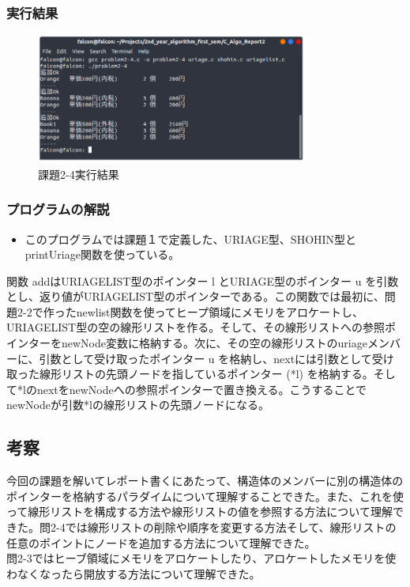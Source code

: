 \documentclass[10pt]{article}
\begin{document}
\subsubsection{実行結果}
\begin{figure}[H]
	\centering
	\includegraphics[width=0.8\textwidth]{problem2-4.png}
	\caption{課題2-4実行結果}
\end{figure}

\subsubsection{プログラムの解説}
\begin{itemize}
    \item このプログラムでは課題１で定義した、URIAGE型、SHOHIN型とprintUriage関数を使っている。
\end{itemize}

関数 addはURIAGELIST型のポインター l とURIAGE型のポインター u を引数とし、返り値がURIAGELIST型のポインターである。この関数では最初に、問題2-2で作ったnewlist関数を使ってヒープ領域にメモリをアロケートし、URIAGELIST型の空の線形リストを作る。そして、その線形リストへの参照ポインターをnewNode変数に格納する。次に、その空の線形リストのuriageメンバーに、引数として受け取ったポインター u を格納し、nextには引数として受け取った線形リストの先頭ノードを指しているポインター (*l) を格納する。そして*lのnextをnewNodeへの参照ポインターで置き換える。こうすることでnewNodeが引数*lの線形リストの先頭ノードになる。

\subsection{考察}
今回の課題を解いてレポート書くにあたって、構造体のメンバーに別の構造体のポインターを格納するパラダイムについて理解することできた。また、これを使って線形リストを構成する方法や線形リストの値を参照する方法について理解できた。問2-4では線形リストの削除や順序を変更する方法そして、線形リストの任意のポイントにノードを追加する方法について理解できた。\\
問2-3ではヒーブ領域にメモリをアロケートしたり、アロケートしたメモリを使わなくなったら開放する方法について理解できた。
\end{document}
